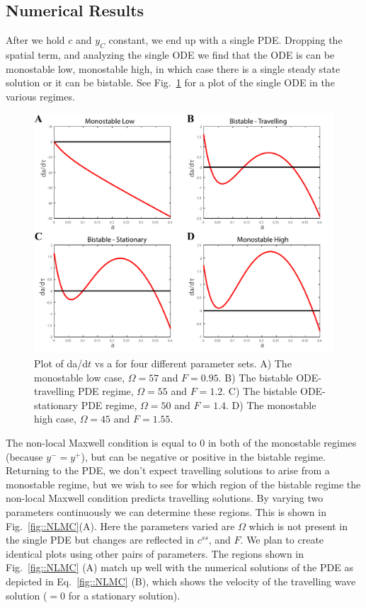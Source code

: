 \subsection{Numerical Results}


After we hold $c$ and $y_C$ constant, we end up with a single PDE. Dropping the spatial term, and analyzing the single ODE we find that the ODE is can be monostable low, monostable high, in which case there is a single steady state solution or it can be bistable. See Fig.~\ref{fig::phaseline} for a plot of the single ODE in the various regimes. 
\begin{figure}[h]
\centering
\captionsetup{width=0.9\linewidth}
\includegraphics[width=4.5in]{Project2/figs/phaseline.pdf}
\caption{Plot of da/d$t$ vs a for four different parameter sets. A) The monostable low case, $\Omega = 57$ and $F = 0.95$. B) The bistable ODE-travelling PDE regime, $\Omega = 55$ and $F = 1.2$. C) The  bistable ODE-stationary PDE regime, $\Omega =50 $ and $F = 1.4$. D) The monostable high case,  $\Omega = 45$ and $F = 1.55$.}
\label{fig::phaseline}
\end{figure}

\hspace{6pt}

The non-local Maxwell condition is equal to $0$ in both of the monostable regimes (because $y^- = y^+$), but can be negative or positive in the bistable regime. Returning to the PDE, we don't expect travelling solutions to arise from a monostable regime, but we wish to see for which region of the bistable regime the non-local Maxwell condition predicts travelling solutions. By varying two parameters continuously we can determine these regions. This is shown in Fig.~\ref{fig::NLMC}(A). Here the parameters varied are $\Omega$ which is not present in the single PDE but changes are reflected in $c^{ss}$, and $F$. We plan to create identical plots using other pairs of parameters. The regions shown in Fig.~\ref{fig::NLMC} (A) match up well with the numerical solutions of the PDE as depicted in Eq.~\ref{fig::NLMC} (B), which shows the velocity of the travelling wave solution ($=0$ for a stationary solution).


